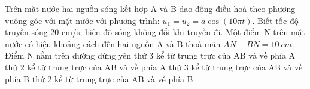 \begin{vidu}%
Trên mặt nước hai nguồn sóng kết hợp A và B dao động điều hoà theo phương vuông góc với mặt nước với phương trình: $u_1=u_2=a\cos \left(10\pi t\right)$. Biết tốc độ truyền sóng 20 cm/s; biên độ sóng không đổi khi truyền đi. Một điểm N trên mặt nước có hiệu khoảng cách đến hai nguồn A và B thoả mãn $AN-BN=10\ cm$. Điểm N nằm trên đường đứng yên
\choice
{thứ 3 kể từ trung trực của AB và về phía A}
{thứ 2 kể từ trung trực của AB và về phía A}
{\True thứ 3 kể từ trung trực của AB và về phía B}
{thứ 2 kể từ trung trực của AB và về phía B}
\end{vidu} 

